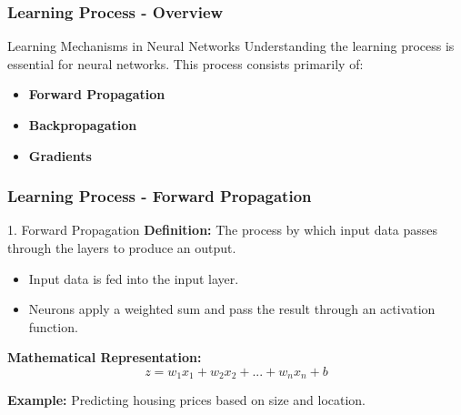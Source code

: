 \documentclass{beamer}
\begin{document}
\begin{frame}[fragile]
    \frametitle{Learning Process - Overview}
    \begin{block}{Learning Mechanisms in Neural Networks}
        Understanding the learning process is essential for neural networks. This process consists primarily of:
        \begin{itemize}
            \item \textbf{Forward Propagation}
            \item \textbf{Backpropagation}
            \item \textbf{Gradients}
        \end{itemize}
    \end{block}
\end{frame}

\begin{frame}[fragile]
    \frametitle{Learning Process - Forward Propagation}
    \begin{block}{1. Forward Propagation}
        \textbf{Definition:} The process by which input data passes through the layers to produce an output.
        \begin{itemize}
            \item Input data is fed into the input layer.
            \item Neurons apply a weighted sum and pass the result through an activation function.
        \end{itemize}
        
        \textbf{Mathematical Representation:}
        \begin{equation}
            z = w_1 x_1 + w_2 x_2 + ... + w_n x_n + b
        \end{equation}
    \end{block}
    
    \textbf{Example:} Predicting housing prices based on size and location.
\end{frame}
\end{document}
